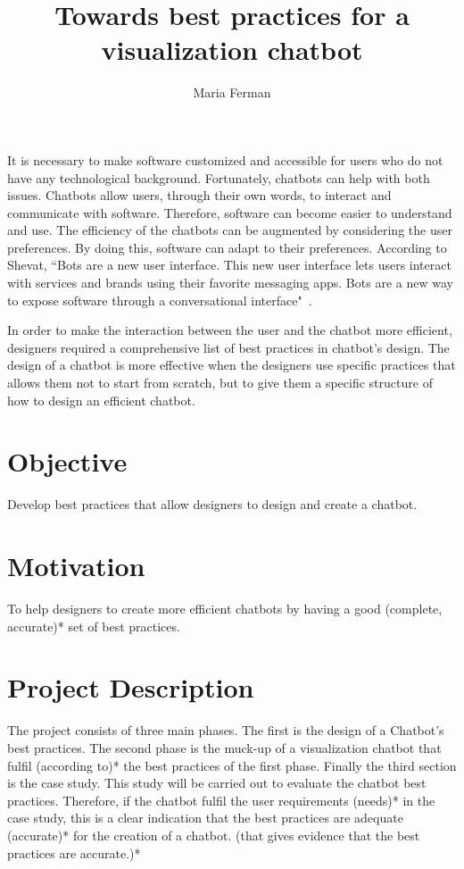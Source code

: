 \documentclass[a4paper,10pt]{article}
\title{Towards best practices for a visualization chatbot}
\author{Maria Ferman}
\begin{document}
\maketitle
It is necessary to make software customized and accessible for users who do not have any technological background. Fortunately, chatbots can help with both issues. Chatbots allow users, through their own words, to interact and communicate with software. Therefore, software can become easier to understand and use. The efficiency of the chatbots can be augmented by considering the user preferences. By doing this, software can adapt to their preferences. According to Shevat,  ``Bots are a new user interface. This new user interface lets users interact with services and brands using their favorite messaging apps. Bots are a new way to expose software through a conversational interface"~\cite{Shevat2017}. 

In order to make the interaction between the user and the chatbot more efficient, designers required a comprehensive list of best practices in chatbot's design. 
The design of a chatbot is more effective when the designers use specific practices that allows them not to start from scratch, but to give them a specific structure of how to design an efficient chatbot. 

\section*{Objective}

Develop best practices that allow designers to design and create a chatbot.

\section*{Motivation}

To help designers to create more efficient chatbots by having a good (complete, accurate)* set of best practices.  

\section*{Project Description}

The project consists of three main phases. The first is the design of a Chatbot's best practices. The second phase is the muck-up of a visualization chatbot that fulfil (according to)* the best practices of the first phase. Finally the third section is the case study. This study will be carried out to evaluate the chatbot best practices. Therefore, if the chatbot fulfil the user requirements (needs)* in the case study, this is a clear indication that the best practices are adequate (accurate)* for the creation of a chatbot. (that gives evidence that the best practices are accurate.)*
\end{document}
